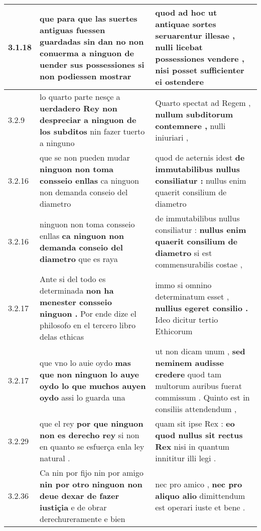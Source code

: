 \begin{tabular}{|p{1cm}|p{6.5cm}|p{6.5cm}|}
3.1.18 & que para que las suertes antiguas fuessen guardadas \textbf{ sin dan no non conuerma a ninguon de uender sus possessiones } si non podiessen mostrar & quod ad hoc ut antiquae sortes seruarentur illesae , \textbf{ nulli licebat possessiones vendere , } nisi posset sufficienter ei ostendere \\\hline
3.2.9 & lo quarto parte nesçe a \textbf{ uerdadero Rey non despreciar a ninguon de los subditos } nin fazer tuerto a ninguno & Quarto spectat ad Regem , \textbf{ nullum subditorum contemnere , } nulli iniuriari , \\\hline
3.2.16 & que se non pueden mudar \textbf{ ninguon non toma consseio enllas } ca ninguon non demanda conseio del diametro & quod de aeternis idest \textbf{ de immutabilibus nullus consiliatur : } nullus enim quaerit consilium de diametro \\\hline
3.2.16 & ninguon non toma consseio enllas \textbf{ ca ninguon non demanda conseio del diametro } que es raya & de immutabilibus nullus consiliatur : \textbf{ nullus enim quaerit consilium de diametro } si est commensurabilis costae , \\\hline
3.2.17 & Ante si del todo es determinada \textbf{ non ha menester consseio ninguon . } Por ende dize el philosofo en el tercero libro delas ethicas & immo si omnino determinatum esset , \textbf{ nullius egeret consilio . } Ideo dicitur tertio Ethicorum \\\hline
3.2.17 & que vno lo auie oydo \textbf{ mas que non ninguon lo auye oydo lo que muchos auyen oydo } assi lo guarda una & ut non dicam unum , \textbf{ sed neminem audisse credere } quod tam multorum auribus fuerat commissum . Quinto est in consiliis attendendum , \\\hline
3.2.29 & que el rey \textbf{ por que ninguon non es derecho rey } si non en quanto se esfuerça enla ley natural . & quam sit ipse Rex : \textbf{ eo quod nullus sit rectus Rex } nisi in quantum innititur illi legi . \\\hline
3.2.36 & Ca nin por fijo nin por amigo \textbf{ nin por otro ninguon non deue dexar de fazer iustiçia } e de obrar derechureramente e bien & nec pro amico , \textbf{ nec pro aliquo alio } dimittendum est operari iuste et bene . \\\hline

\end{tabular}
